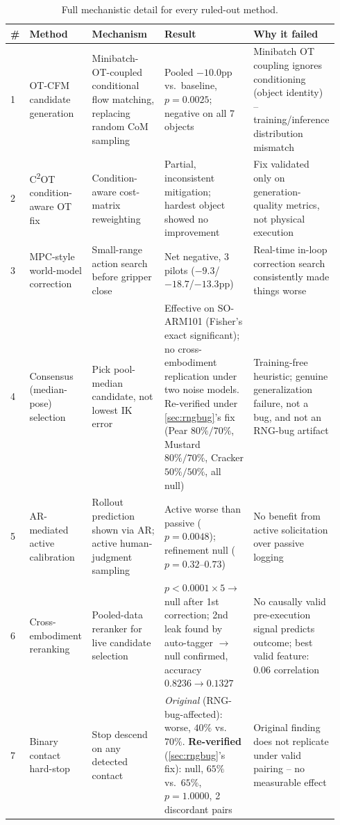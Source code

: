 \documentclass[journal]{IEEEtran}
\begin{document}
\begin{table}[t]
\centering
\caption{Full mechanistic detail for every ruled-out method.}
\small
\begin{tabular}{@{}p{0.02\linewidth}p{0.19\linewidth}p{0.22\linewidth}p{0.27\linewidth}p{0.24\linewidth}@{}}
\toprule
\# & Method & Mechanism & Result & Why it failed \\
\midrule
1 & OT-CFM candidate generation & Minibatch-OT-coupled conditional flow matching, replacing random CoM sampling & Pooled $-10.0$pp vs.\ baseline, $p{=}0.0025$; negative on all 7 objects & Minibatch OT coupling ignores conditioning (object identity) -- training/inference distribution mismatch \\
2 & C\textsuperscript{2}OT condition-aware OT fix & Condition-aware cost-matrix reweighting & Partial, inconsistent mitigation; hardest object showed no improvement & Fix validated only on generation-quality metrics, not physical execution \\
3 & MPC-style world-model correction & Small-range action search before gripper close & Net negative, 3 pilots ($-9.3$/$-18.7$/$-13.3$pp) & Real-time in-loop correction search consistently made things worse \\
4 & Consensus (median-pose) selection & Pick pool-median candidate, not lowest IK error & Effective on SO-ARM101 (Fisher's exact significant); no cross-embodiment replication under two noise models. Re-verified under \cref{sec:rngbug}'s fix (Pear $80\%/70\%$, Mustard $80\%/70\%$, Cracker $50\%/50\%$, all null) & Training-free heuristic; genuine generalization failure, not a bug, and not an RNG-bug artifact \\
5 & AR-mediated active calibration & Rollout prediction shown via AR; active human-judgment sampling & Active worse than passive ($p{=}0.0048$); refinement null ($p{=}0.32$--$0.73$) & No benefit from active solicitation over passive logging \\
6 & Cross-embodiment reranking & Pooled-data reranker for live candidate selection & $p{<}0.0001{\times}5 \rightarrow$ null after 1st correction; 2nd leak found by auto-tagger $\rightarrow$ null confirmed, accuracy $0.8236{\rightarrow}0.1327$ & No causally valid pre-execution signal predicts outcome; best valid feature: $0.06$ correlation \\
7 & Binary contact hard-stop & Stop descend on any detected contact & \emph{Original} (RNG-bug-affected): worse, $40\%$ vs.\ $70\%$. \textbf{Re-verified} (\cref{sec:rngbug}'s fix): null, $65\%$ vs.\ $65\%$, $p{=}1.0000$, 2 discordant pairs & Original finding does not replicate under valid pairing -- no measurable effect \\

\end{tabular}
\end{table}
\end{document}
